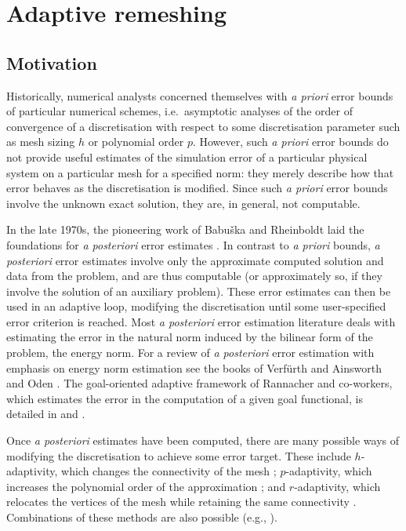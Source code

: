 
\chapter{Adaptive remeshing}\label{chap:Adaptivity}

\section{Motivation}
Historically, numerical analysts concerned themselves
with \emph{a priori} error bounds of particular numerical
schemes, i.e.\@ \ asymptotic analyses of the order of convergence
of a discretisation with respect to some discretisation parameter
such as mesh sizing $h$ or polynomial order $p$. However, such
\emph{a priori} error bounds do not provide useful estimates
of the simulation error of a particular physical system on
a particular mesh for a specified norm: they merely describe
how that error behaves as the discretisation is modified. Since
such \emph{a priori} error bounds involve the unknown exact solution,
they are, in general, not computable.

In the late 1970s, the pioneering work of Babu\v ska
and Rheinboldt laid the foundations for \emph{a posteriori}
error estimates \citep{babuska1978,babuska1978b}.
In contrast to \emph{a priori} bounds,
\emph{a posteriori} error estimates involve only
the approximate computed solution and data from the problem,
and are thus computable (or approximately so, if they involve the
solution of an auxiliary problem). These error
estimates can then be used in an adaptive loop, modifying
the discretisation until some user-specified error criterion
is reached. Most \emph{a posteriori} error estimation literature deals with estimating
the error in the natural norm induced by the bilinear form
of the problem, the energy norm.
For a review of \emph{a posteriori} error estimation
with emphasis on energy norm estimation
see the books of Verf\"urth \citep{verfurth1996} and
Ainsworth and Oden \citep{ainsworth2000}. The goal-oriented
adaptive framework of Rannacher and co-workers, which estimates
the error in the computation of a given goal functional, is detailed
in \citet{becker2001} and \citet{bangerth2003}.

Once \emph{a posteriori} estimates have been computed, 
there are many possible ways of modifying the discretisation
to achieve some error target. These include $h$-adaptivity,
which changes the connectivity of the mesh \citep{berger1989}; $p$-adaptivity,
which increases the polynomial order of the approximation 
\citep{babuska1994}; and $r$-adaptivity, which relocates
the vertices of the mesh while retaining the same connectivity
\citep{budd2009}. Combinations of these methods are also
possible (e.g., \citet{houston2001,ledger2003}).

